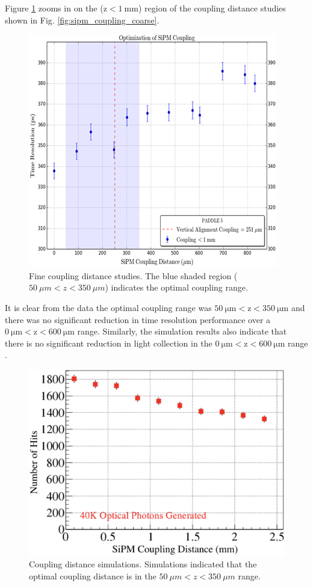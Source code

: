 Figure \ref{fig:sipm_coupling_fine} zooms in on the ($\mathrm{z < 1\ mm}$) region of the coupling distance studies shown in Fig. \ref{fig:sipm_coupling_coarse}.
\begin{figure}[!htb]
	\centering
	\includegraphics[width=1.0\columnwidth]{misalignment/figs/sipm_coupling_fine}
	\caption{Fine coupling distance studies.  The blue shaded region ($50\ \mu m < z < 350\ \mu m$) indicates the optimal coupling range.}
	\label{fig:sipm_coupling_fine}
\end{figure}
It is clear from the data the optimal coupling range was $\mathrm{50\ \mu m < z < 350\ \mu m}$ and there was no significant reduction in time resolution performance over a $\mathrm{0\ \mu m < z < 600\ \mu m}$ range.  Similarly, the simulation results also indicate that there is no significant reduction in light collection in the $\mathrm{0\ \mu m < z < 600\ \mu m}$ range \cite{puneet_sim_talk}.
\begin{figure}[!htb]
	\centering
	\includegraphics[width=1.0\columnwidth]{misalignment/figs/spacing_sim}
	\caption{Coupling distance simulations. Simulations indicated that the optimal coupling distance is in the $50\ \mu m < z < 350\ \mu m$ range.}
	\label{fig:spacing_sim}
\end{figure}


